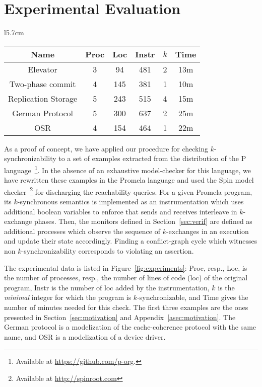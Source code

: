 \section{Experimental Evaluation}

\begin{wrapfigure}{l}{5.7cm}
\vspace{-8mm}
{\scriptsize
\begin{tabular}{|c|c|c|c|c|c|}
\hline
Name & Proc & Loc & Instr & $k$ & Time \\
\hline
Elevator& 3 & 94 & 481 & 2 & 13m  \\
\hline
Two-phase commit &4 & 145 & 381 & 1 & 10m  \\
\hline
Replication Storage & 5 & 243 & 515 & 4 & 15m \\
\hline
German Protocol & 5 & 300 & 637 & 2 & 25m \\
\hline
OSR & 4 & 154 & 464  & 1 & 22m \\
\hline
\end{tabular}
}
\caption{Experimental results.}
\label{fig:experiments}
\vspace{-7mm}
\end{wrapfigure}
As a proof of concept, we have applied our procedure for checking $k$-synchronizability to a set of examples extracted from the distribution of the P language~\footnote{Available at \url{https://github.com/p-org}.}. In the absence of an exhaustive model-checker for this language, we have rewritten these examples in the Promela language and used the Spin model checker~\footnote{Available at \url{http://spinroot.com}} for discharging the reachability queries. For a given Promela program, its $k$-synchronous semantics is implemented as an instrumentation which uses additional boolean variables to enforce that sends and receives interleave in $k$-exchange phases. Then, the monitors defined in Section~\ref{sec:verif} are defined as additional processes which observe the sequence of $k$-exchanges in an execution and update their state accordingly. Finding a conflict-graph cycle which witnesses non $k$-synchronizability corresponds to violating an assertion. 

The experimental data is listed in Figure~\ref{fig:experiments}: Proc, resp., Loc, is the number of processes, resp., the number of lines of code (loc) of the original program, Instr is the number of loc added by the instrumentation, $k$ is the \emph{minimal} integer for which the program is $k$-synchronizable, and Time gives the number of minutes needed for this check. The first three examples are the ones presented in Section~\ref{sec:motivation} and Appendix~\ref{asec:motivation}. The German protocol is a modelization of the cache-coherence protocol with the same name, and OSR is a modelization of a device driver.
